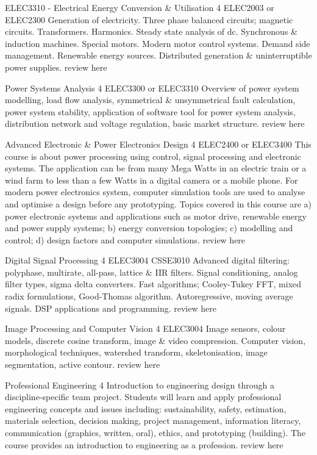 	{ELEC3310 - Electrical Energy Conversion \& Utilisation}
	{4}
	{ELEC2003 or ELEC2300}
	{}
	{}
	{Generation of electricity. Three phase balanced circuits; magnetic circuits. Transformers. Harmonics. Steady state analysis of dc. Synchronous \& induction machines. Special motors. Modern motor control systems. Demand side management. Renewable energy sources. Distributed generation \& uninterruptible power supplies.}
	{review here}

	{Power Systems Analysis}
	{4}
	{ELEC3300 or ELEC3310}
	{}
	{}
	{Overview of power system modelling, load flow analysis, symmetrical \& unsymmetrical fault calculation, power system stability, application of software tool for power system analysis, distribution network and voltage regulation, basic market structure.}
	{review here}

	{Advanced Electronic \& Power Electronics Design}
	{4}
	{ELEC2400 or ELEC3400}
	{}
	{}
	{This course is about power processing using control, signal processing and electronic systems. The application can be from many Mega Watts in an electric train or a wind farm to less than a few Watts in a digital camera or a mobile phone. For modern power electronics system, computer simulation tools are used to analyse and optimise a design before any prototyping. Topics covered in this course are a) power electronic systems and applications such as motor drive, renewable energy and power supply systems; b) energy conversion topologies; c) modelling and control; d) design factors and computer simulations.}
	{review here}

	{Digital Signal Processing}
	{4}
	{ELEC3004}
	{CSSE3010}
	{Advanced digital filtering: polyphase, multirate, all-pass, lattice \& IIR filters. Signal conditioning, analog filter types, sigma delta converters. Fast algorithms; Cooley-Tukey FFT, mixed radix formulations, Good-Thomas algorithm. Autoregressive, moving average signals. DSP applications and programming.}
	{review here}

	{Image Processing and Computer Vision}
	{4}
	{ELEC3004}
	{}
	{}
	{Image sensors, colour models, discrete cosine transform, image \& video compression. Computer vision, morphological techniques, watershed transform, skeletonisation, image segmentation, active contour.}
	{review here}

	{Professional Engineering}
	{4}
	{}
	{}
	{}
	{Introduction to engineering design through a discipline-specific team project. Students will learn and apply professional engineering concepts and issues including: sustainability, safety, estimation, materials selection, decision making, project management, information literacy, communication (graphics, written, oral), ethics, and prototyping (building). The course provides an introduction to engineering as a profession.}
	{review here}


